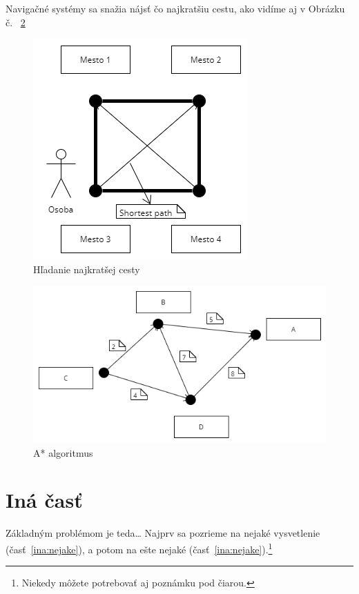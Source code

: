 \documentclass[10pt,twocolumn,twoside,slovak,a4paper]{article}
\begin{document}
Navigačné systémy sa snažia nájsť čo najkratšiu cestu, ako vidíme aj v Obrázku č. ~\ref{fig:hladanieNajkratsejCesty}
\begin{figure}[h!]
\centering
  \includegraphics[scale=0.6]{graf1.png}
  \caption{Hľadanie najkratšej cesty}
  \label{fig:hladanieNajkratsejCesty}
\end{figure}
\begin{figure}[h!]
\centering
  \includegraphics[scale=0.4]{graf2.png}
  \caption{A* algoritmus}
  \label{fig:hladanieNajkratsejCesty}
\end{figure}


\section{Iná časť} \label{ina}

Základným problémom je teda\ldots{} Najprv sa pozrieme na nejaké vysvetlenie (časť~\ref{ina:nejake}), a potom na ešte nejaké (časť~\ref{ina:nejake}).\footnote{Niekedy môžete potrebovať aj poznámku pod čiarou.}
\end{document}
